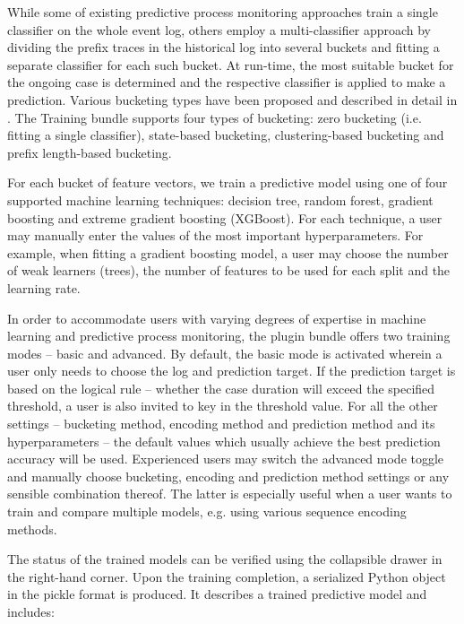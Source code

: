 \documentclass[runningheads,a4paper]{llncs}
\begin{document}
While some of existing predictive process monitoring approaches train a single classifier on the whole event log, others employ a multi-classifier approach by dividing the prefix traces in the historical log into several buckets and fitting a separate classifier for each such bucket. At run-time, the most suitable bucket for the ongoing case is determined and the respective classifier is applied to make a prediction. Various bucketing types have been proposed and described in detail in \cite{Teinemaa2017}. The Training bundle supports four types of bucketing: zero bucketing (i.e. fitting a single classifier), state-based bucketing, clustering-based bucketing and prefix length-based bucketing.

For each bucket of feature vectors, we train a predictive model using one of four supported machine learning techniques: decision tree, random forest, gradient boosting and extreme gradient boosting (XGBoost). For each technique, a user may manually enter the values of the most important hyperparameters. For example, when fitting a gradient boosting model, a user may choose the number of weak learners (trees), the number of features to be used for each split and the learning rate.

In order to accommodate users with varying degrees of expertise in machine learning and predictive process monitoring, the plugin bundle offers two training modes -- basic and advanced. By default, the basic mode is activated wherein a user only needs to choose the log and prediction target. If the prediction target is based on the logical rule -- whether the case duration will exceed the specified threshold, a user is also invited to key in the threshold value. For all the other settings -- bucketing method, encoding method and prediction method and its hyperparameters -- the default values which usually achieve the best prediction accuracy will be used. Experienced users may switch the advanced mode toggle and manually choose bucketing, encoding and prediction method settings or any sensible combination thereof. The latter is especially useful when a user wants to train and compare multiple models, e.g. using various sequence encoding methods.

The status of the trained models can be verified using the collapsible drawer in the right-hand corner. Upon the training completion, a serialized Python object in the pickle format is produced. It describes a trained predictive model and includes:
\end{document}

